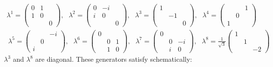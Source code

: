 \begin{equation}
\begin{split}
\lambda ^1 =\begin{pmatrix} 0& 1 &\\ 1& 0 &\\ & & 0 \end{pmatrix},\:\:\: \lambda ^2 =\begin{pmatrix} 0& -i &\\ i& 0 &\\ & & 0 \end{pmatrix}, 
\:\:\: \lambda ^3 =\begin{pmatrix} 1&  &\\ & -1 &\\ & & 0 \end{pmatrix}, \:\:\: \lambda ^4 =\begin{pmatrix} &  &1\\ & 0&\\1 & &  \end{pmatrix}\\\
\lambda ^5 =\begin{pmatrix} &  &-i\\ & 0 &\\ i& &  \end{pmatrix},\:\:\: \lambda ^6 =\begin{pmatrix} 0&  &\\ & 0 &1\\ & 1& 0 \end{pmatrix}, 
\:\:\: \lambda ^7 =\begin{pmatrix} 0&  &\\ & 0 &-i\\ & i& 0 \end{pmatrix}, \:\:\: \lambda ^8 =\frac{1}{\sqrt3}\begin{pmatrix} 1&  &\\ & 1&\\ & &-2  \end{pmatrix}
\end{split}
\end{equation}
$ {\lambda}^3 $ and $  {\lambda}^8 $ are diagonal. These generators satisfy schematically:\\ 
